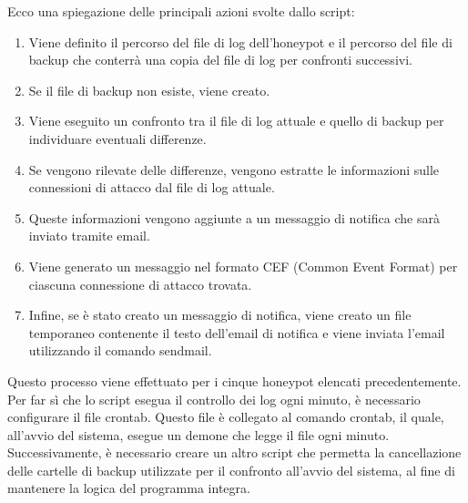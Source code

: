Ecco una spiegazione delle principali azioni svolte dallo script:
\begin{enumerate}
	\item Viene definito il percorso del file di log dell'honeypot e il percorso del file di backup che conterrà una copia del file di log per confronti successivi.
	\item Se il file di backup non esiste, viene creato.
	\item Viene eseguito un confronto tra il file di log attuale e quello di backup per individuare eventuali differenze.
	\item Se vengono rilevate delle differenze, vengono estratte le informazioni sulle connessioni di attacco dal file di log attuale.
	\item Queste informazioni vengono aggiunte a un messaggio di notifica che sarà inviato tramite email.
	\item Viene generato un messaggio nel formato CEF (Common Event Format) per ciascuna connessione di attacco trovata.
	\item Infine, se è stato creato un messaggio di notifica, viene creato un file temporaneo contenente il testo dell'email di notifica e viene inviata l'email utilizzando il comando sendmail.
\end{enumerate}
Questo processo viene effettuato per i cinque honeypot elencati precedentemente. Per far sì che lo script esegua il controllo dei log ogni minuto, è necessario configurare il file crontab. Questo file è collegato al comando crontab, il quale, all'avvio del sistema, esegue un demone che legge il file ogni minuto.\\
Successivamente, è necessario creare un altro script che permetta la cancellazione delle cartelle di backup utilizzate per il confronto all'avvio del sistema, al fine di mantenere la logica del programma integra.

\clearpage

